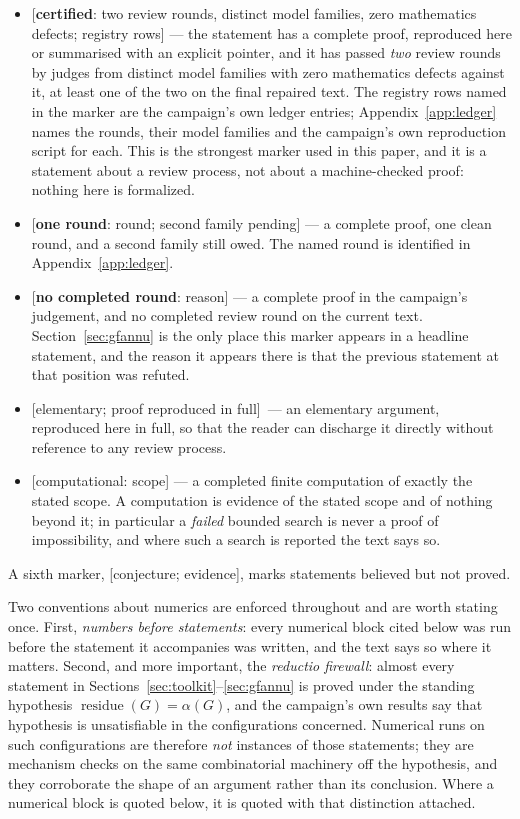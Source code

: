 \documentclass[11pt]{article}
\theoremstyle{plain}
\theoremstyle{definition}
\theoremstyle{remark}
\numberwithin{equation}{section}
\DeclareMathOperator{\res}{residue}
\newcommand{\statusbox}[1]{{\small\sloppy\textsf{[#1]}}}
\newcommand{\Scert}[1]{\statusbox{\textbf{certified}: two review rounds, distinct
  model families, zero mathematics defects; #1}}
\newcommand{\Sone}[1]{\statusbox{\textbf{one round}: #1; second family pending}}
\newcommand{\Szero}[1]{\statusbox{\textbf{no completed round}: #1}}
\newcommand{\Selem}{\statusbox{elementary; proof reproduced in full}}
\newcommand{\Scomp}[1]{\statusbox{computational: #1}}
\newcommand{\Sconj}[1]{\statusbox{conjecture; #1}}
\begin{document}
\begin{itemize}
\item \Scert{registry rows} --- the statement has a complete proof, reproduced here or
summarised with an explicit pointer, and it has passed \emph{two} review rounds by judges
from distinct model families with zero mathematics defects against it, at least one of the
two on the final repaired text. The registry rows named in the marker are the campaign's own
ledger entries; Appendix~\ref{app:ledger} names the rounds, their model families and the
campaign's own reproduction script for each.
This is the strongest marker used in this paper, and it is a statement about a review
process, not about a machine-checked proof: nothing here is formalized.
\item \Sone{round} --- a complete proof, one clean round, and a second family still owed.
The named round is identified in Appendix~\ref{app:ledger}.
\item \Szero{reason} --- a complete proof in the campaign's judgement, and no completed
review round on the current text. Section~\ref{sec:gfannu} is the only place this marker
appears in a headline statement, and the reason it appears there is that the previous
statement at that position was refuted.
\item \Selem\ --- an elementary argument, reproduced here in full, so that the reader can
discharge it directly without reference to any review process.
\item \Scomp{scope} --- a completed finite computation of exactly the stated scope. A
computation is evidence of the stated scope and of nothing beyond it; in particular a
\emph{failed} bounded search is never a proof of impossibility, and where such a search is
reported the text says so.
\end{itemize}

A sixth marker, \Sconj{evidence}, marks statements believed but not proved.

Two conventions about numerics are enforced throughout and are worth stating once. First,
\emph{numbers before statements}: every numerical block cited below was run before the
statement it accompanies was written, and the text says so where it matters. Second, and
more important, the \emph{reductio firewall}: almost every statement in
Sections~\ref{sec:toolkit}--\ref{sec:gfannu} is proved under the standing hypothesis
$\res(G) = \alpha(G)$, and the campaign's own results say that hypothesis is unsatisfiable in
the configurations concerned. Numerical runs on such configurations are therefore
\emph{not} instances of those statements; they are mechanism checks on the same
combinatorial machinery off the hypothesis, and they corroborate the shape of an argument
rather than its conclusion. Where a numerical block is quoted below, it is quoted with that
distinction attached.
\end{document}
